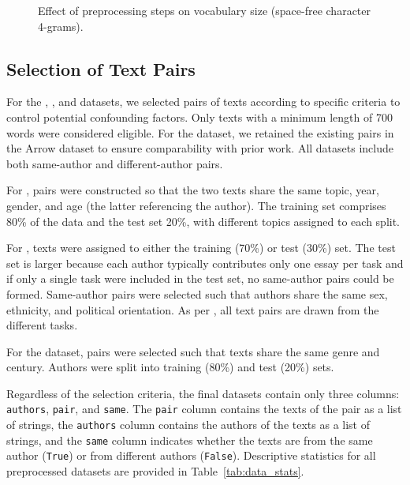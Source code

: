 \begin{figure}[htbp]
    \centering
    
    \caption{Effect of preprocessing steps on vocabulary size (space-free character 4-grams).}
    \label{fig:preprocesing_impact_vocab_size}
\end{figure}


\subsection{Selection of Text Pairs}
\label{subsec:dataset_text_pair_selection}

For the \dataBlog{}, \dataStudent{}, and \dataGutenberg{} datasets, we selected pairs of texts according to specific criteria to control potential confounding factors.
Only texts with a minimum length of \num{700} words were considered eligible. 
For the \dataPan{} dataset, we retained the existing pairs in the Arrow dataset to ensure comparability with prior work. 
All datasets include both same-author and different-author pairs. 

For \dataBlog{}, pairs were constructed so that the two texts share the same topic, year, gender, and age (the latter referencing the author). 
The training set comprises 80\% of the data and the test set 20\%, with different topics assigned to each split.

For \dataStudent{}, texts were assigned to either the training (70\%) or test (30\%) set. 
The test set is larger because each author typically contributes only one essay per task and if only a single task were included in the test set, no same-author pairs could be formed. 
Same-author pairs were selected such that authors share the same sex, ethnicity, and political orientation. 
As per \citep{koppel_determining_2014}, all text pairs are drawn from the different tasks.


For the \dataGutenberg{} dataset, pairs were selected such that texts share the same genre and century. 
Authors were split into training (80\%) and test (20\%) sets.

Regardless of the selection criteria, the final datasets contain only three columns: \texttt{authors}, \texttt{pair}, and \texttt{same}.
The \texttt{pair} column contains the texts of the pair as a list of strings,
the \texttt{authors} column contains the authors of the texts as a list of strings,
and the \texttt{same} column indicates whether the texts are from the same author (\texttt{True}) or from different authors (\texttt{False}).
Descriptive statistics for all preprocessed datasets are provided in Table~\ref{tab:data_stats}.

